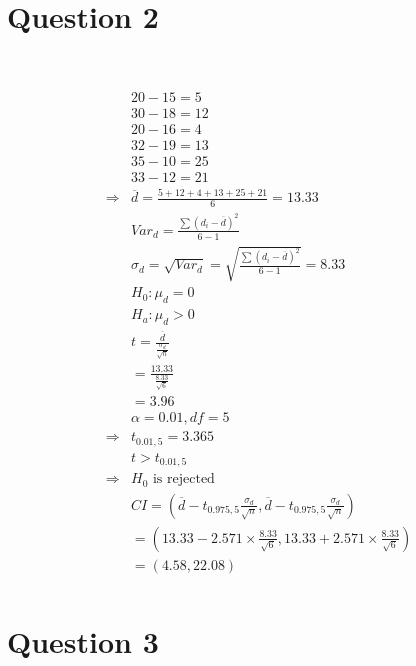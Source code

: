 \documentclass{article}
\begin{document}
\section*{Question 2}

~

\begin{align*}
    &20-15=5\\
    &30-18=12\\
    &20-16=4\\
    &32-19=13\\
    &35-10=25\\
    &33-12=21\\
    \Rightarrow&\overline{d}=\frac{5+12+4+13+25+21}{6}=13.33\\
    &Var_d=\frac{\sum(d_i-\overline{d})^2}{6-1}\\
    &\sigma_d=\sqrt{Var_d}=\sqrt{\frac{\sum(d_i-\overline{d})^2}{6-1}}=8.33\\
    &H_0:\mu_d=0\\
    &H_a:\mu_d>0\\
    &t=\frac{\overline{d}}{\frac{\sigma_d}{\sqrt{n}}}\\
    &=\frac{13.33}{\frac{8.33}{\sqrt{6}}}\\
    &=3.96\\
    &\alpha=0.01,df=5\\
    \Rightarrow&t_{0.01,5}=3.365\\
    &t>t_{0.01,5}\\
    \Rightarrow&H_0\text{ is rejected}\\
    &CI=(\overline{d}-t_{0.975,5}\frac{\sigma_d}{\sqrt{n}},\overline{d}-t_{0.975,5}\frac{\sigma_d}{\sqrt{n}})\\
    &=(13.33-2.571\times\frac{8.33}{\sqrt{6}},13.33+2.571\times\frac{8.33}{\sqrt{6}})\\
    &=(4.58,22.08)\\
\end{align*}

\newpage

\section*{Question 3}

~
\end{document}
